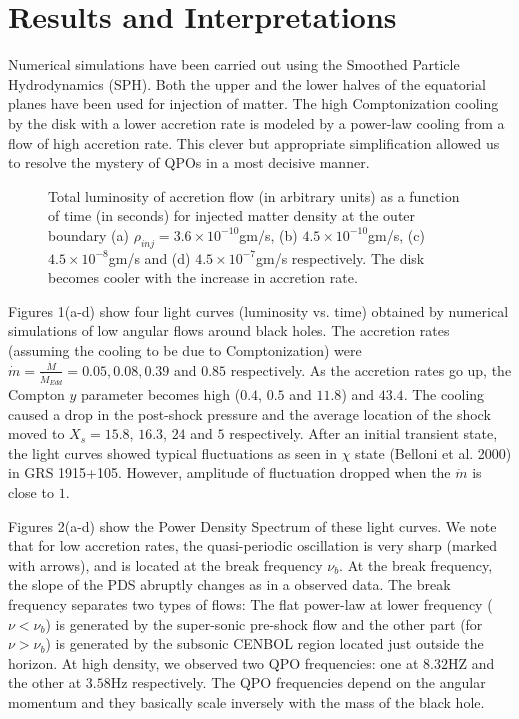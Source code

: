 \documentclass{ws-procs975x65}
\begin{document}
\section{Results and Interpretations}

Numerical simulations have been carried out using the Smoothed Particle Hydrodynamics (SPH).
Both the upper and the lower halves of the equatorial planes have been used 
for injection of matter. The high Comptonization cooling by the disk with a
lower accretion rate is modeled by a power-law cooling from a flow of high accretion 
rate. This clever but appropriate simplification allowed us to resolve the mystery of 
QPOs in a most decisive manner. 

\begin{figure}[t]
\vskip 0.0cm
\centerline{\epsfxsize=5.0in} 
\vskip -3.0cm
\caption{
Total luminosity of accretion flow (in arbitrary units) as a function of time (in seconds)
for injected matter density at the outer boundary (a) $\rho_{inj}=3.6\times 10^{-10}$gm/s, (b) $4.5
\times 10^{-10}$gm/s, (c) $4.5 \times 10^{-8}$gm/s and (d) $4.5 \times 10^{-7}$gm/s respectively.
The disk becomes cooler with the increase in accretion rate.
}
\end{figure}

Figures 1(a-d) show four light curves (luminosity vs. time) obtained by numerical simulations of low 
angular flows around black holes.  The accretion rates (assuming the cooling to be due to Comptonization)
were ${\dot m}= \frac{\dot M}{\dot M_{Edd}}= 0.05, 0.08, 0.39$ and $0.85$ respectively. As the 
accretion rates go up, the Compton $y$ parameter becomes high ($0.4$, $0.5$ and $11.8$)
and $43.4$. The cooling caused a drop in the post-shock pressure and the average 
location of the shock moved to $X_s= 15.8$, $16.3$, $24$ and $5$ respectively. 
After an initial transient state, the light curves showed typical fluctuations
as seen in $\chi$ state (Belloni et al. 2000) in GRS 1915+105. However, amplitude 
of fluctuation dropped when the ${\dot m}$ is close to $1$.

Figures 2(a-d) show the Power Density Spectrum of these light curves. We note that 
for low accretion rates, the quasi-periodic oscillation is very sharp (marked with arrows), and is located 
at the break frequency $\nu_b$. At the break frequency, the slope of the PDS abruptly changes
as in a observed data. The break frequency separates two types of flows: The flat power-law at lower frequency
($\nu<\nu_b$) is generated by the super-sonic pre-shock flow and the other part (for $\nu>\nu_b$) 
is generated by the subsonic CENBOL region located just outside the horizon. At high density, we observed
two QPO frequencies: one at $8.32$HZ and the other at $3.58$Hz respectively. The QPO frequencies depend on the
angular momentum and they basically scale inversely with the mass of the black hole. 
\end{document}
